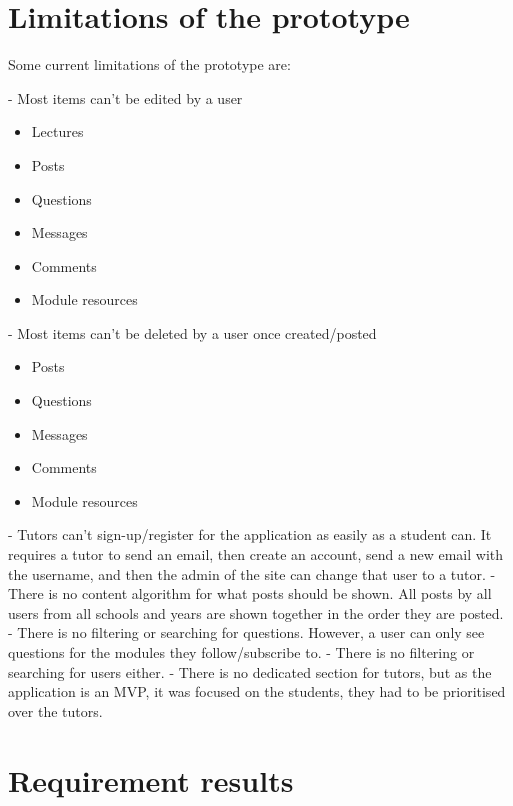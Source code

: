 \section{Limitations of the prototype}
Some current limitations of the prototype are:

- Most items can't be edited by a user
    \begin{itemize}
        \item Lectures
        \item Posts
        \item Questions
        \item Messages
        \item Comments
        \item Module resources
    \end{itemize}
- Most items can't be deleted by a user once created/posted
    \begin{itemize}
        \item Posts
        \item Questions
        \item Messages
        \item Comments
        \item Module resources
    \end{itemize}
- Tutors can't sign-up/register for the application as easily as a student can. It requires a tutor to send an email, then create an account, send a new email with the username, and then the admin of the site can change that user to a tutor. \newline\newline
- There is no content algorithm for what posts should be shown. All posts by all users from all schools and years are shown together in the order they are posted.\newline\newline
- There is no filtering or searching for questions. However, a user can only see questions for the modules they follow/subscribe to.\newline\newline
- There is no filtering or searching for users either.\newline\newline
- There is no dedicated section for tutors,  but as the application is an MVP, it was focused on the students, they had to be prioritised over the tutors.



\section{Requirement results}
